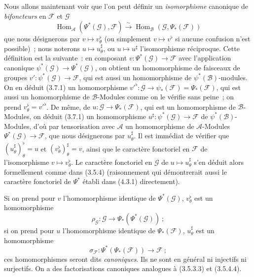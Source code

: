 \begin{env}[4.4.3]
\label{0.4.4.3-fr}
Nous allons maintenant voir que l'on peut définir un \emph{isomorphisme}
canonique de \emph{bifoncteurs} en $\mathcal{F}$ et $\mathcal{G}$
\[
  \operatorname{Hom}_{\mathcal{A}}(\Psi^*(\mathcal{G}),\mathcal{F})
  \xrightarrow{\sim}
  \operatorname{Hom}_{\mathcal{B}}(\mathcal{G},\Psi_*(\mathcal{F}))
  \tag{4.4.3.1}\label{0.4.4.3.1-fr}
\]
que nous désignerons par $v\mapsto v_\theta^\flat$ (ou simplement
$v\mapsto v^\flat$ si aucune confusion n'est possible)~; nous noterons
$u\mapsto u_\theta^\sharp$, ou $u\mapsto u^\sharp$ l'isomorphisme réciproque.
Cette définition est la suivante~: en composant
$v:\Psi^*(\mathcal{G})\to\mathcal{F}$ avec l'application canonique
$\psi^*(\mathcal{G})\to\Psi^*(\mathcal{G})$, on obtient un homomorphisme de
faisceaux de groupes $v':\psi^*(\mathcal{G})\to\mathcal{F}$, qui est aussi un
homomorphisme de $\psi^*(\mathcal{B})$-modules. On en déduit (3.7.1) un
homomorphisme
${v'}^\flat:\mathcal{G}\to\psi_*(\mathcal{F})=\Psi_*(\mathcal{F})$, qui est
aussi un homomorphisme de $\mathcal{B}$-Modules comme on
le vérifie sans peine~; on prend $v_\theta^\flat={v'}^\flat$. De même, de
$u:\mathcal{G}\to\Psi_*(\mathcal{F})$, qui est un homomorphisme de
$\mathcal{B}$-Modules, on déduit (3.7.1) un homomorphisme
$u^\sharp:\psi^*(\mathcal{G})\to\mathcal{F}$ de
$\psi^*(\mathcal{B})$-Modules, d'où par tensorisation avec $\mathcal{A}$ un
homomorphisme de $\mathcal{A}$-Modules
$\Psi^*(\mathcal{G})\to\mathcal{F}$, que nous désignerons par
$u_\theta^\sharp$. Il est immédiat de vérifier que
$(u_\theta^\sharp)_\theta^\flat=u$ et
$(v_\theta^\flat)_\theta^\sharp=v$, ainsi que le caractère fonctoriel en
$\mathcal{F}$ de l'isomorphisme $v\mapsto v_\theta^\flat$. Le caractère
fonctoriel en $\mathcal{G}$ de $u\mapsto u_\theta^\sharp$ s'en déduit alors
formellement comme dans (3.5.4) (raisonnement qui démontrerait aussi le
caractère fonctoriel de $\Psi^*$ établi dans (4.3.1) directement).

Si on prend pour $v$ l'homomorphisme identique de $\Psi^*(\mathcal{G})$,
$v_\theta^\flat$ est un homomorphisme
\[
  \rho_{\mathcal{G}}:\mathcal{G}\longrightarrow
  \Psi_*(\Psi^*(\mathcal{G}))~;
  \tag{4.4.3.2}\label{0.4.4.3.2-fr}
\]
si on prend pour $u$ l'homomorphisme identique de $\Psi_*(\mathcal{F})$,
$u_\theta^\sharp$ est un homomorphisme
\[
  \sigma_{\mathcal{F}}:\Psi^*(\Psi_*(\mathcal{F}))
  \longrightarrow\mathcal{F}~;
  \tag{4.4.3.3}\label{0.4.4.3.3-fr}
\]
ces homomorphismes seront dits \emph{canoniques}. Ils ne sont en général ni
injectifs ni surjectifs. On a des factorisations canoniques analogues à
(3.5.3.3) et (3.5.4.4).


\end{env}
